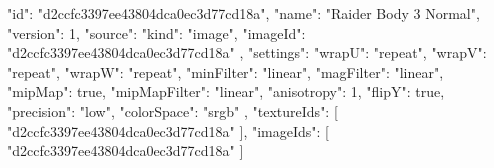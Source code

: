 {
  "id": "d2ccfc3397ee43804dca0ec3d77cd18a",
  "name": "Raider Body 3 Normal",
  "version": 1,
  "source": {
    "kind": "image",
    "imageId": "d2ccfc3397ee43804dca0ec3d77cd18a"
  },
  "settings": {
    "wrapU": "repeat",
    "wrapV": "repeat",
    "wrapW": "repeat",
    "minFilter": "linear",
    "magFilter": "linear",
    "mipMap": true,
    "mipMapFilter": "linear",
    "anisotropy": 1,
    "flipY": true,
    "precision": "low",
    "colorSpace": "srgb"
  },
  "textureIds": [
    "d2ccfc3397ee43804dca0ec3d77cd18a"
  ],
  "imageIds": [
    "d2ccfc3397ee43804dca0ec3d77cd18a"
  ]
}
